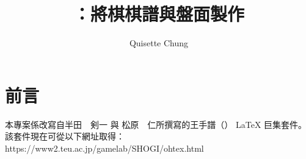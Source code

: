 \documentclass[a4paper, 10pt,]{article}
\begin{document}
\title{\RyuOhTeX：將棋棋譜與盤面製作}
\author{Quisette Chung}

	\maketitle
	\tableofcontents

\setcounter{section}{-1}

\section{前言}
本專案係改寫自半田　剣一 與 松原　仁所撰寫的王手譜（\OhTeX） \LaTeX{} 巨集套件。\\
該套件現在可從以下網址取得：\\
https://www2.teu.ac.jp/gamelab/SHOGI/ohtex.html
\newpage
\newpage

\newpage

\newpage

\newpage
\end{document}
